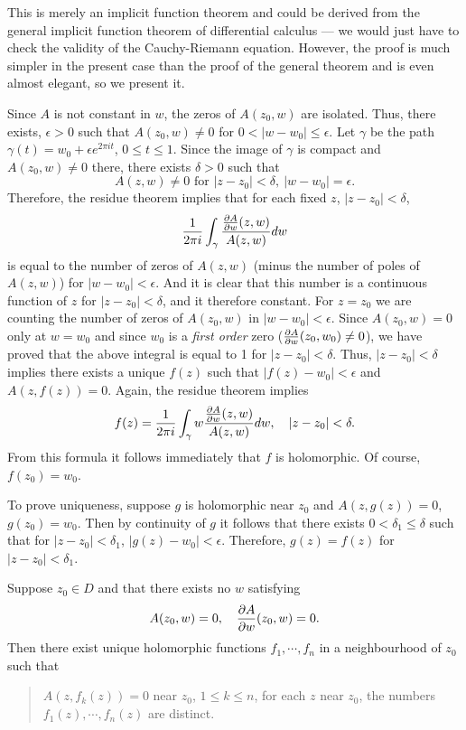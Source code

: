 \documentclass[a4paper,11pt]{article}
\begin{document}
\begin{myproof}
  This is merely an implicit function theorem and could be derived
  from the general implicit function theorem of differential calculus
  --- we would just have to check the validity of the Cauchy-Riemann
  equation.  However, the proof is much simpler in the present case
  than the proof of the general theorem and is even almost elegant, so
  we present it.

  Since $A$ is not constant in $w$, the zeros of $A(z_0, w)$ are
  isolated.  Thus, there exists, $\epsilon > 0$ such that $A(z_0,w)
  \ne 0$ for $0 < |w-w_0| \le \epsilon$.  Let $\gamma$ be the path
  $\gamma(t) = w_0 + \epsilon e^{2\pi i t}$, $0 \le t \le 1$.  Since
  the image of $\gamma$ is compact and $A(z_0, w) \ne 0$ there, there
  exists $\delta > 0$ such that
  $$
  A(z,w) \ne 0\text{ for } |z-z_0| < \delta,\ |w-w_0| = \epsilon.
  $$
  Therefore, the residue theorem implies that for each fixed $z$,
  $|z-z_0| < \delta$,
  $$
  \frac{1}{2\pi i} \int_\gamma \frac{\frac{\partial A}{\partial w}(z,w)}{A(z,w)} dw
  $$
  is equal to the number of zeros of $A(z,w)$ (minus the number of
  poles of $A(z,w)$) for $|w-w_0| < \epsilon$.  And it is clear that
  this number is a continuous function of $z$ for $|z-z_0| < \delta$,
  and it therefore constant.  For $z=z_0$ we are counting the number
  of zeros of $A(z_0, w)$ in $|w-w_0| < \epsilon$.  Since $A(z_0, w) =
  0$ only at $w = w_0$ and since $w_0$ is a \emph{first order} zero
  ($\frac{\partial A}{\partial w}(z_0, w_0) \ne 0$), we have proved that the above
  integral is equal to 1 for $|z-z_0| < \delta$.  Thus, $|z-z_0| <
  \delta$ implies there exists a unique $f(z)$ such that $|f(z) - w_0|
  < \epsilon$ and $A(z, f(z)) = 0$.  Again, the residue theorem
  implies
  $$
  f(z) = \frac{1}{2\pi i} \int_\gamma w \frac{\frac{\partial A}{\partial
      w}(z,w)}{A(z,w)} dw,\quad
  |z-z_0| < \delta.
  $$
  From this formula it follows immediately that $f$ is holomorphic.
  Of course, $f(z_0) = w_0$.

  To prove uniqueness, suppose $g$ is holomorphic near $z_0$ and $A(z,
  g(z)) = 0$, $g(z_0) = w_0$.  Then by continuity of $g$ it follows
  that there exists $0 < \delta_1 \le \delta$ such that for $|z - z_0|
  < \delta_1$, $|g(z) - w_0| < \epsilon$.  Therefore, $g(z) = f(z)$
  for $|z-z_0| < \delta_1$.
\end{myproof}

\begin{cor}
  Suppose $z_0 \in D$ and that there exists no $w$ satisfying
  $$
  A(z_0, w) = 0, \quad \frac{\partial A}{\partial w}(z_0, w) = 0.
  $$
  Then there exist unique holomorphic functions $f_1, \cdots, f_n$ in
  a neighbourhood of $z_0$ such that
  \begin{quote}
    $A(z, f_k(z)) = 0$ near $z_0$, $1 \le k \le n$, for each $z$ near
    $z_0$, the numbers $f_1(z), \cdots, f_n(z)$ are distinct.
  \end{quote}
\end{cor}
\end{document}
